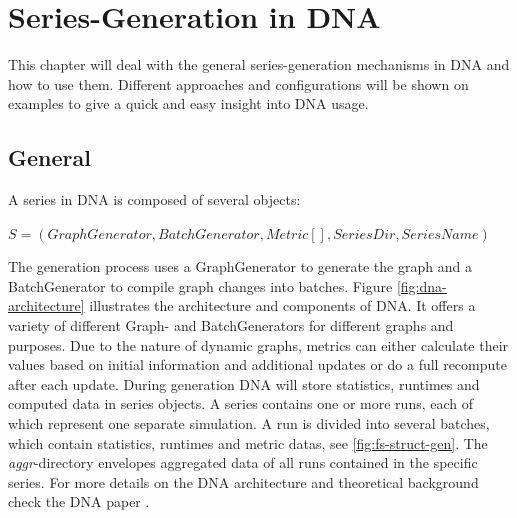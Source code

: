 \chapter{Series-Generation in DNA}
This chapter will deal with the general series-generation mechanisms in DNA and how to use them. Different approaches and configurations will be shown on examples to give a quick and easy insight into DNA usage.

\section{General}
A series in DNA is composed of several objects:

\begin{center}
\begin{math}
S = (GraphGenerator, BatchGenerator, Metric[], SeriesDir, SeriesName)
\end{math}
\end{center}

The generation process uses a GraphGenerator to generate the graph and a BatchGenerator to
compile graph changes into batches. Figure \ref{fig:dna-architecture} illustrates the architecture and components of DNA. It offers a variety of different Graph- and BatchGenerators for different graphs and purposes. Due to the nature of dynamic graphs, metrics can either calculate their values based on initial information and additional updates or do a full recompute after each update. During generation DNA will store statistics, runtimes and computed data in series objects. A series contains one or more runs, each of which represent one separate simulation. A run is divided into several batches, which contain statistics, runtimes and metric datas, see \ref{fig:fs-struct-gen}. The \textit{aggr}-directory envelopes aggregated data of all runs contained in the specific series. For more details on the DNA architecture and theoretical background check the DNA paper \cite{dna-paper13}.

